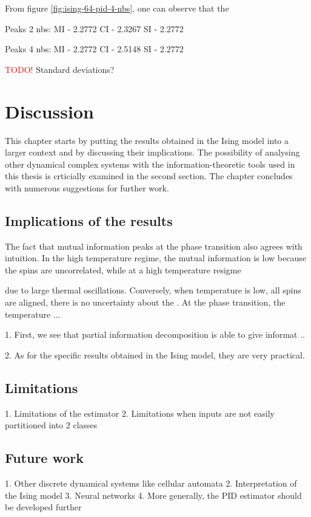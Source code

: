 \documentclass[12pt]{article}
\begin{document}
From figure \ref{fig:ising-64-pid-4-nbs}, one can observe that the 

Peaks 2 nbs:
MI - 2.2772
CI - 2.3267
SI - 2.2772

Peaks 4 nbs:
MI - 2.2772
CI - 2.5148
SI - 2.2772


\textcolor{red}{TODO!} Standard deviations?

\newpage
\section{Discussion}

This chapter starts by putting the results obtained in the Ising model into a larger context and by discussing their implications.  The possibility of analysing other dynamical complex systems with the information-theoretic tools used in this thesis is crticially examined in the second section. The chapter concludes with numerous suggestions for further work. 

\subsection{Implications of the results}


The fact that mutual information peaks at the phase transition also agrees with intuition. In the high temperature regime, the mutual information is low because the spins are uncorrelated, while at a high temperature resigme 

 due to large thermal oscillations. Conversely, when temperature is low, all spins are aligned, there is no uncertainty about the . At the phase transition, the temperature   ...

1. First, we see that partial information decomposition is able to give informat ..

2. As for the specific results obtained in the Ising model, they are very practical.

\subsection{Limitations}

1. Limitations of the estimator
2. Limitations when inputs are not easily partitioned into 2 classes

\subsection{Future work}

1. Other discrete dynamical systems like cellular automata
2. Interpretation of the Ising model 
3. Neural networks
4. More generally, the PID estimator should be developed further
\end{document}
